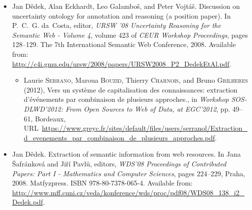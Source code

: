 \documentclass[12pt,a4paper,oneside,notitlepage]{article}
\newcommand{\urlprefix}{URL~}
\begin{document}
\begin{itemize}
\begin{itemize}

\end{itemize}



\item
Jan D{\v{e}}dek, Alan Eckhardt, Leo Galambo{\v{s}}, and Peter
  Vojt{\'{a}}{\v{s}}.
\newblock Discussion on uncertainty ontology for annotation and reasoning (a
  position paper).
\newblock In P.~C.~G. da~Costa, editor, {\em {URSW} '08 Uncertainty Reasoning
  for the Semantic Web - Volume 4}, volume 423 of {\em {CEUR} Workshop
  Proceedings}, pages 128--129. The 7th International Semantic Web Conference,
  2008.
\newblock Available from:
  \url{http://c4i.gmu.edu/ursw/2008/papers/URSW2008_P2_DedekEtAl.pdf}.

\begin{itemize}
\item
Laurie \textsc{Serrano}, Maroua \textsc{Bouzid}, Thierry \textsc{Charnois}, and
  Bruno \textsc{Grilheres} (2012), Vers un syst{\`e}me de capitalisation des
  connaissances: extraction d'{\'e}v{\'e}nements par combinaison de plusieurs
  approches., in \emph{{Workshop SOS-DLWD'2012: From Open Sources to Web of
  Data, at EGC'2012}}, pp. 49--61, Bordeaux,
  \urlprefix\url{https://www.greyc.fr/sites/default/files/users/serranol/Extraction_d_evenements_par_combinaison_de_plusieurs_approches.pdf}.
\end{itemize}




\item
Jan D{\v{e}}dek.
\newblock Extraction of semantic information from web resources.
\newblock In Jana {\v{S}}afr{\'{a}}nkov{\'{a}} and Ji{\v{r}}{\'{i}}
  Pavl{\r{u}}, editors, {\em {WDS}'08 Proceedings of Contributed Papers: Part I
  - Mathematics and Computer Sciences}, pages 224--229, Praha, 2008.
  Matfyzpress.
\newblock ISBN 978-80-7378-065-4.
\newblock Available from:
  \url{http://www.mff.cuni.cz/veda/konference/wds/proc/pdf08/WDS08_138_i2_Dedek.pdf}.


\end{itemize}
\end{document}
